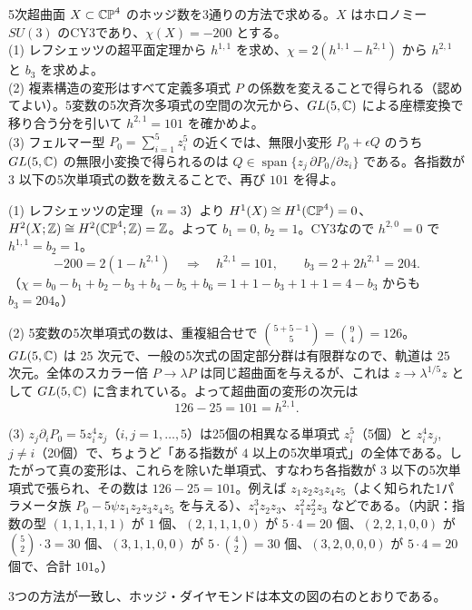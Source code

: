 \begin{problem}[難易度 C]\label{ch10-prob-h21}
5次超曲面 $X\subset\mathbb{CP}^4$ のホッジ数を3通りの方法で求める。$X$ はホロノミー $SU(3)$ のCY3であり、$\chi(X)=-200$ とする。\\
(1) レフシェッツの超平面定理から $h^{1,1}$ を求め、$\chi=2(h^{1,1}-h^{2,1})$ から $h^{2,1}$ と $b_3$ を求めよ。\\
(2) 複素構造の変形はすべて定義多項式 $P$ の係数を変えることで得られる（認めてよい）。5変数の5次斉次多項式の空間の次元から、$GL(5,\mathbb{C})$ による座標変換で移り合う分を引いて $h^{2,1}=101$ を確かめよ。\\
(3) フェルマー型 $P_0=\sum_{i=1}^5z_i^5$ の近くでは、無限小変形 $P_0+\epsilon Q$ のうち $GL(5,\mathbb{C})$ の無限小変換で得られるのは $Q\in\operatorname{span}\{z_j\,\partial P_0/\partial z_i\}$ である。各指数が $3$ 以下の5次単項式の数を数えることで、再び $101$ を得よ。
\end{problem}

\begin{solution}
(1) レフシェッツの定理（$n=3$）より $H^1(X)\cong H^1(\mathbb{CP}^4)=0$、$H^2(X;\mathbb{Z})\cong H^2(\mathbb{CP}^4;\mathbb{Z})=\mathbb{Z}$。よって $b_1=0$, $b_2=1$。CY3なので $h^{2,0}=0$ で $h^{1,1}=b_2=1$。
\[
-200=2(1-h^{2,1})\quad\Longrightarrow\quad h^{2,1}=101,\qquad b_3=2+2h^{2,1}=204.
\]
（$\chi=b_0-b_1+b_2-b_3+b_4-b_5+b_6=1+1-b_3+1+1=4-b_3$ からも $b_3=204$。）

(2) 5変数の5次単項式の数は、重複組合せで $\binom{5+5-1}{5}=\binom94=126$。$GL(5,\mathbb{C})$ は $25$ 次元で、一般の5次式の固定部分群は有限群なので、軌道は $25$ 次元。全体のスカラー倍 $P\to\lambda P$ は同じ超曲面を与えるが、これは $z\to\lambda^{1/5}z$ として $GL(5,\mathbb{C})$ に含まれている。よって超曲面の変形の次元は
\[
126-25=101=h^{2,1}.
\]

(3) $z_j\partial_iP_0=5z_i^4z_j$（$i,j=1,\dots,5$）は25個の相異なる単項式 $z_i^5$（5個）と $z_i^4z_j$, $j\ne i$（20個）で、ちょうど「ある指数が $4$ 以上の5次単項式」の全体である。したがって真の変形は、これらを除いた単項式、すなわち各指数が $3$ 以下の5次単項式で張られ、その数は $126-25=101$。例えば $z_1z_2z_3z_4z_5$（よく知られた1パラメータ族 $P_0-5\psi z_1z_2z_3z_4z_5$ を与える）、$z_1^3z_2z_3$、$z_1^2z_2^2z_3$ などである。（内訳：指数の型 $(1,1,1,1,1)$ が $1$ 個、$(2,1,1,1,0)$ が $5\cdot4=20$ 個、$(2,2,1,0,0)$ が $\binom52\cdot3=30$ 個、$(3,1,1,0,0)$ が $5\cdot\binom42=30$ 個、$(3,2,0,0,0)$ が $5\cdot4=20$ 個で、合計 $101$。）

3つの方法が一致し、ホッジ・ダイヤモンドは本文の図の右のとおりである。
\end{solution}

